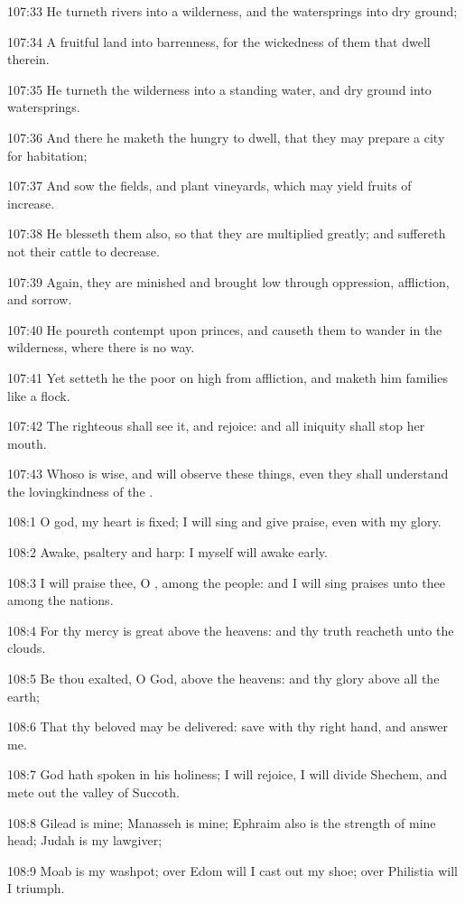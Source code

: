 107:33 He turneth rivers into a wilderness, and the watersprings into
dry ground;

107:34 A fruitful land into barrenness, for the wickedness of them
that dwell therein.

107:35 He turneth the wilderness into a standing water, and dry ground
into watersprings.

107:36 And there he maketh the hungry to dwell, that they may prepare
a city for habitation;

107:37 And sow the fields, and plant vineyards, which may yield fruits
of increase.

107:38 He blesseth them also, so that they are multiplied greatly; and
suffereth not their cattle to decrease.

107:39 Again, they are minished and brought low through oppression,
affliction, and sorrow.

107:40 He poureth contempt upon princes, and causeth them to wander in
the wilderness, where there is no way.

107:41 Yet setteth he the poor on high from affliction, and maketh him
families like a flock.

107:42 The righteous shall see it, and rejoice: and all iniquity shall
stop her mouth.

107:43 Whoso is wise, and will observe these things, even they shall
understand the lovingkindness of the \LORD.



108:1 O god, my heart is fixed; I will sing and give praise, even with
my glory.

108:2 Awake, psaltery and harp: I myself will awake early.

108:3 I will praise thee, O \LORD, among the people: and I will sing
praises unto thee among the nations.

108:4 For thy mercy is great above the heavens: and thy truth reacheth
unto the clouds.

108:5 Be thou exalted, O God, above the heavens: and thy glory above
all the earth;

108:6 That thy beloved may be delivered: save with thy right hand, and
answer me.

108:7 God hath spoken in his holiness; I will rejoice, I will divide
Shechem, and mete out the valley of Succoth.

108:8 Gilead is mine; Manasseh is mine; Ephraim also is the strength
of mine head; Judah is my lawgiver;

108:9 Moab is my washpot; over Edom will I cast out my shoe; over
Philistia will I triumph.

